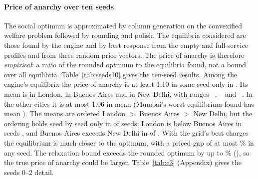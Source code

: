 \documentclass[preprint,12pt]{elsarticle}
\theoremstyle{definition}
\theoremstyle{remark}
\begin{document}
\paragraph{Price of anarchy over ten seeds} The social optimum is approximated by column generation on the convexified welfare problem followed by rounding and polish. The equilibria considered are those found by the engine and by best response from the empty and full-service profiles and from three random price vectors. The price of anarchy is therefore \emph{empirical}: a ratio of the rounded optimum to the equilibria found, not a bound over all equilibria. Table~\ref{tab:seeds10} gives the ten-seed results. Among the engine's equilibria the price of anarchy is at least 1.10 in some seed only in \TenPoaHiCities. Its mean is \TenPoaLondon{} in London, \TenPoaBuenosAires{} in Buenos Aires and \TenPoaNewDelhi{} in New Delhi, with ranges \TenPoaMinLondon--\TenPoaMaxLondon{}, \TenPoaMinBuenosAires--\TenPoaMaxBuenosAires{} and \TenPoaMinNewDelhi--\TenPoaMaxNewDelhi{}. In the other cities it is at most 1.06 in mean (Mumbai's worst equilibrium found has mean \TenMumbaiWorst). The means are ordered London $>$ Buenos Aires $>$ New Delhi, but the ordering holds seed by seed only in \TenPoaOrderAll{} of \TenPoaOrderN{} seeds: London is below Buenos Aires in seeds \TenPoaOrderFailSeeds, and Buenos Aires exceeds New Delhi in \TenPoaOrderBN{} of \TenPoaOrderN. With the grid's best charges the equilibrium is much closer to the optimum, with a priced gap of at most \TenPricedGapMax\% in any seed. The relaxation bound exceeds the rounded optimum by up to \SObound\% (\SOboundCity), so the true price of anarchy could be larger. Table~\ref{tab:e3} (Appendix) gives the seeds 0--2 detail.

\begin{table}[tbp]\centering\small
\caption{Ten-seed summary (exact oracle). $n_{\rm eq}$, $n_{\rm grid}$: seeds for the equilibrium quantities and for grid-derived quantities; $^*$: reduced exact grid, grid quantities are lower bounds. PoA of the engine's equilibrium, mean with bootstrap 95\% CI. Gains are \% of $|$social cost$|$ of the best exact grid point with the congestion charge only or the delivery charge only: mean (maximum over seeds). Delivery share: delivery-only gain over the combined gain per seed. Priced gap: shortfall of the equilibrium under the grid's best charges from the rounded optimum, \%.}\label{tab:seeds10}
\end{table}
\end{document}
